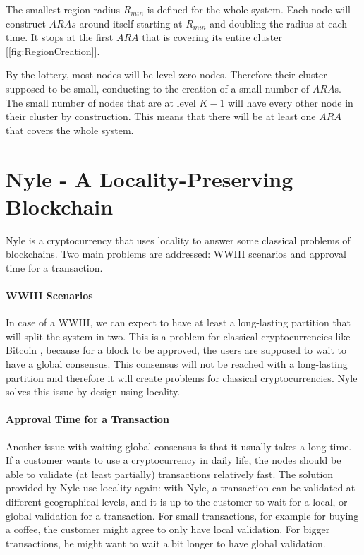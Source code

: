 \documentclass[a4paper,11pt,oneside]{report}
\begin{document}
The smallest region radius $R_{min}$ is defined for the whole system. Each node
will construct $ARAs$ around itself starting at $R_{min}$ and doubling the
radius at each time. It stops at the first $ARA$ that is covering its entire
cluster [\autoref{fig:RegionCreation}]. 

By the lottery, most nodes will be level-zero nodes. Therefore their cluster
supposed to be small, conducting to the creation of a small number of $ARA$s.
The small number of nodes that are at level $K-1$ will have every other node
in their cluster by construction. This means that there will be at least one
$ARA$ that covers the whole system. 

\section{Nyle - A Locality-Preserving Blockchain}

Nyle is a cryptocurrency that uses locality to answer some classical problems of blockchains. Two main problems are addressed: WWIII scenarios and
approval time for a transaction.
 
\paragraph{WWIII Scenarios} \label{WWIII} In case of a WWIII, we can expect to have
at least a long-lasting partition that will split the system in two. This is a
problem for classical cryptocurrencies like Bitcoin \cite{Nakamoto2009}, because for a
block to be approved, the users are supposed to wait to have a global
consensus. This consensus will not be reached with a long-lasting partition and
therefore it will create problems for classical cryptocurrencies. Nyle solves
this issue by design using locality.

\paragraph{Approval Time for a Transaction} \label{approve_time} Another issue
with waiting global consensus is that it usually takes a long time. If a
customer wants to use a cryptocurrency in daily life, the nodes should be able to validate (at least partially) transactions relatively fast. The
solution provided by Nyle use locality again: with Nyle, a transaction can be
validated at different geographical levels, and it is up to the customer to wait for a local, or
global validation for a transaction. For small transactions, for example for
buying a coffee, the customer might agree to only have local validation. For
bigger transactions, he might want to wait a bit longer to have global
validation.
\end{document}
